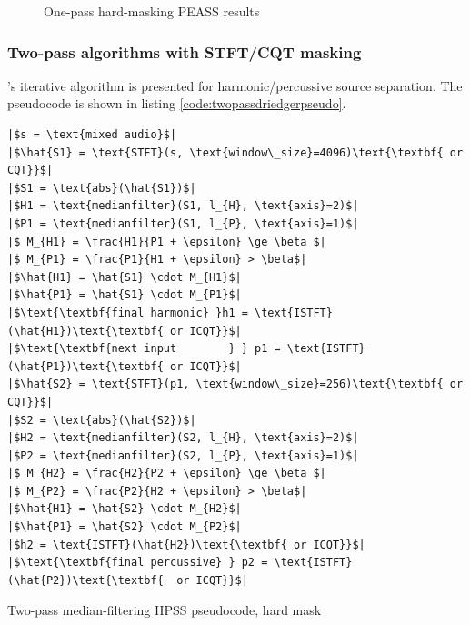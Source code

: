 \documentclass[letter,12pt]{article}
\newlength{\mintednumbersep}
\begin{document}
\begin{figure}
	\centering
	\vspace{-1.25em}
	\caption{One-pass hard-masking PEASS results}
	\label{fig:round1hard}
\end{figure}

\subsubsection{Two-pass algorithms with STFT/CQT masking}

\citet{driedger}'s iterative algorithm is presented for harmonic/percussive source separation. The pseudocode is shown in listing \ref{code:twopassdriedgerpseudo}.

\begin{listing}[h]
\setlength\partopsep{-\topsep}
\begin{verbatim}
|$s = \text{mixed audio}$|
|$\hat{S1} = \text{STFT}(s, \text{window\_size}=4096)\text{\textbf{ or CQT}}$|
|$S1 = \text{abs}(\hat{S1})$|
|$H1 = \text{medianfilter}(S1, l_{H}, \text{axis}=2)$|
|$P1 = \text{medianfilter}(S1, l_{P}, \text{axis}=1)$|
|$ M_{H1} = \frac{H1}{P1 + \epsilon} \ge \beta $|
|$ M_{P1} = \frac{P1}{H1 + \epsilon} > \beta$|
|$\hat{H1} = \hat{S1} \cdot M_{H1}$|
|$\hat{P1} = \hat{S1} \cdot M_{P1}$|
|$\text{\textbf{final harmonic} }h1 = \text{ISTFT}(\hat{H1})\text{\textbf{ or ICQT}}$|
|$\text{\textbf{next input        } } p1 = \text{ISTFT}(\hat{P1})\text{\textbf{ or ICQT}}$|
|$\hat{S2} = \text{STFT}(p1, \text{window\_size}=256)\text{\textbf{ or CQT}}$|
|$S2 = \text{abs}(\hat{S2})$|
|$H2 = \text{medianfilter}(S2, l_{H}, \text{axis}=2)$|
|$P2 = \text{medianfilter}(S2, l_{P}, \text{axis}=1)$|
|$ M_{H2} = \frac{H2}{P2 + \epsilon} \ge \beta $|
|$ M_{P2} = \frac{P2}{H2 + \epsilon} > \beta$|
|$\hat{H1} = \hat{S2} \cdot M_{H2}$|
|$\hat{P1} = \hat{S2} \cdot M_{P2}$|
|$h2 = \text{ISTFT}(\hat{H2})\text{\textbf{ or ICQT}}$|
|$\text{\textbf{final percussive} } p2 = \text{ISTFT}(\hat{P2})\text{\textbf{  or ICQT}}$|
\end{verbatim}
\caption{Two-pass median-filtering HPSS pseudocode, hard mask}
\label{code:twopassdriedgerpseudo}
\end{listing}
\end{document}
